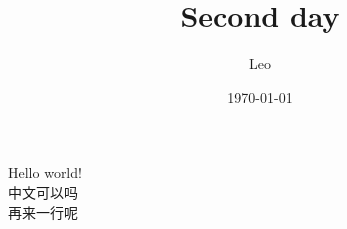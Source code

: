 \documentclass{article}
\title{Second day}
\author{Leo}
\date{\today}
\begin{document}
\maketitle

Hello world! \\

中文可以吗 \\

再来一行呢
\end{document}

